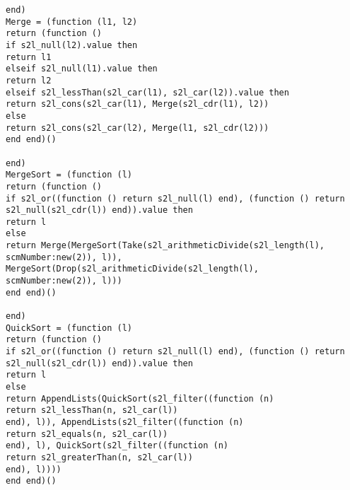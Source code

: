 \begin{verbatim}
end)
Merge = (function (l1, l2)
return (function ()
if s2l_null(l2).value then
return l1
elseif s2l_null(l1).value then
return l2
elseif s2l_lessThan(s2l_car(l1), s2l_car(l2)).value then
return s2l_cons(s2l_car(l1), Merge(s2l_cdr(l1), l2))
else
return s2l_cons(s2l_car(l2), Merge(l1, s2l_cdr(l2)))
end end)()

end)
MergeSort = (function (l)
return (function ()
if s2l_or((function () return s2l_null(l) end), (function () return
s2l_null(s2l_cdr(l)) end)).value then
return l
else
return Merge(MergeSort(Take(s2l_arithmeticDivide(s2l_length(l),
scmNumber:new(2)), l)), MergeSort(Drop(s2l_arithmeticDivide(s2l_length(l),
scmNumber:new(2)), l)))
end end)()

end)
QuickSort = (function (l)
return (function ()
if s2l_or((function () return s2l_null(l) end), (function () return
s2l_null(s2l_cdr(l)) end)).value then
return l
else
return AppendLists(QuickSort(s2l_filter((function (n)
return s2l_lessThan(n, s2l_car(l))
end), l)), AppendLists(s2l_filter((function (n)
return s2l_equals(n, s2l_car(l))
end), l), QuickSort(s2l_filter((function (n)
return s2l_greaterThan(n, s2l_car(l))
end), l))))
end end)()


\end{verbatim}

